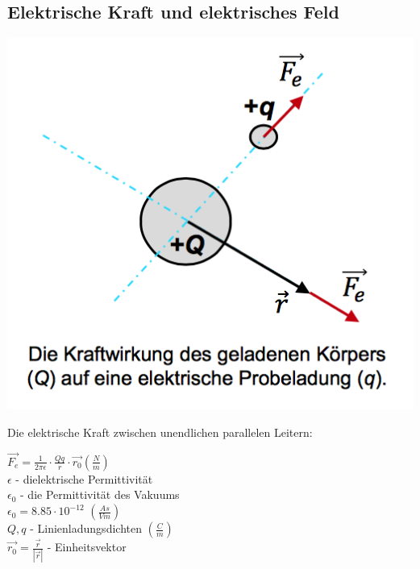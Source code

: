 \subsection{Elektrische Kraft und elektrisches Feld}

\begin{minipage}{0.4 \linewidth}
\includegraphics[width = \linewidth]{./Pics/VL1/elKraft}
\end{minipage}
\begin{minipage}{0.5 \linewidth}
Die elektrische Kraft zwischen unendlichen parallelen Leitern:

$\vec{F_{e}} = \frac{1}{2 \pi \epsilon} \cdot \frac{Qq}{r} \cdot \vec{r_{0}} (\frac{N}{m})$ \\

$\epsilon$ - dielektrische Permittivität \\
$\epsilon_{0}$ - die Permittivität des Vakuums \\
$\epsilon_{0} = 8.85 \cdot 10^{-12}$ $(\frac{As}{Vm})$ \\
$Q,q$ - Linienladungsdichten $(\frac{C}{m})$ \\
$\vec{r_{0}} = \frac{\vec{r}}{|\vec{r}|} $ - Einheitsvektor\\
\end{minipage}

